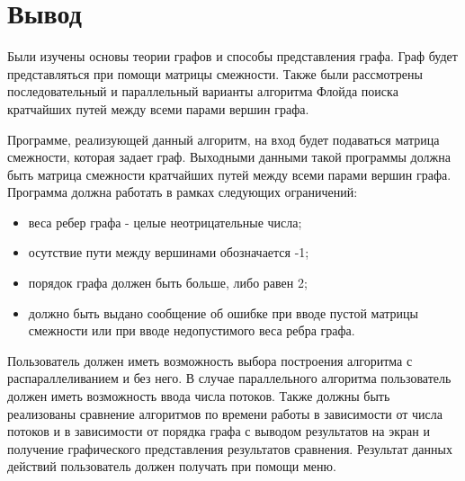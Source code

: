 \section{Вывод}

Были изучены основы теории графов и способы представления графа. Граф будет представляться при помощи матрицы смежности. Также были рассмотрены последовательный и параллельный варианты алгоритма Флойда поиска кратчайших путей между всеми парами вершин графа.

Программе, реализующей данный алгоритм, на вход будет подаваться матрица смежности, которая задает граф. Выходными данными такой программы должна быть матрица смежности кратчайших путей между всеми парами вершин графа. Программа должна работать в рамках следующих ограничений:

\begin{itemize}
	\item веса ребер графа - целые неотрицательные числа;
	\item осутствие пути между вершинами обозначается -1;
	\item порядок графа должен быть больше, либо равен 2;
	\item должно быть выдано сообщение об ошибке при вводе пустой матрицы смежности или при вводе недопустимого веса ребра графа.
\end{itemize}

Пользователь должен иметь возможность выбора построения алгоритма с распараллеливанием и без него. В случае параллельного алгоритма пользователь должен иметь возможность ввода числа потоков. Также должны быть реализованы сравнение алгоритмов по времени работы в зависимости от числа потоков и в зависимости от порядка графа с выводом результатов на экран и получение графического представления результатов сравнения. Результат данных действий пользователь должен получать при помощи меню.